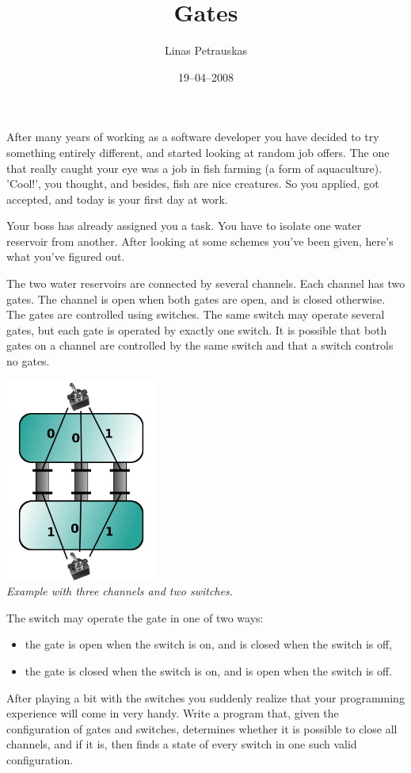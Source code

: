 \documentclass[zad,zawodnik,en]{sinol}
\title{Gates}
\author{Linas Petrauskas}
\date{19--04--2008}
\begin{document}
  \begin{text}%
    After many years of working as a software developer you have decided to try
    something entirely different, and started looking at random job offers.
    The one that really caught your eye was a job in fish farming (a form of
    aquaculture).
    'Cool!', you thought, and besides, fish are
    nice creatures.
    So you applied, got accepted, and today is your first day at work.

    Your boss has already assigned you a task.
    You have to isolate one water reservoir from another.
    After looking at some schemes you've been given, here's what you've figured
    out.

    The two water reservoirs are connected by several channels.
    Each channel has two gates.
    The channel is open when both gates are open, and is closed otherwise.
    The gates are controlled using switches.
    The same switch may operate several gates, but each gate is operated by
    exactly one switch.
    It is possible that both gates on a channel are controlled by the same switch
    and that a switch controls no gates.
    \begin{center}
      \includegraphics[width=5cm]{gates}\\
      \textit{Example with three channels and two switches.}
    \end{center}
    The switch may operate the gate in one of two ways:
    \begin{itemize}
      \item
        the gate is open when the switch is on, and is closed when the switch is off,
      \item 
        the gate is closed when the switch is on, and is open when the switch is off.
    \end{itemize}

    After playing a bit with the switches you suddenly realize that your
    programming experience will come in very handy.
    Write a program that, given the configuration of gates and switches,
    determines whether it is possible to close all channels, and if it is,
    then finds a state of every switch in one such valid configuration.


\end{text}
\end{document}
